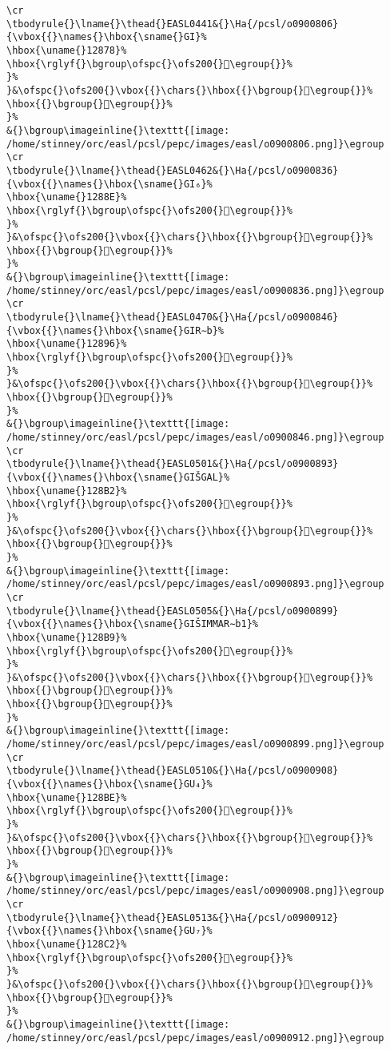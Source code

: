\begin{verbatim}
\cr
\tbodyrule{}\lname{}\thead{}EASL0441&{}\Ha{/pcsl/o0900806}{\vbox{{}\names{}\hbox{\sname{}GI}%
\hbox{\uname{}12878}%
\hbox{\rglyf{}\bgroup\ofspc{}\ofs200{}𒡸\egroup{}}%
}%
}&\ofspc{}\ofs200{}\vbox{{}\chars{}\hbox{{}\bgroup{}𒢄\egroup{}}%
\hbox{{}\bgroup{}𒡸\egroup{}}%
}%
&{}\bgroup\imageinline{}\texttt{[image: /home/stinney/orc/easl/pcsl/pepc/images/easl/o0900806.png]}\egroup
\cr
\tbodyrule{}\lname{}\thead{}EASL0462&{}\Ha{/pcsl/o0900836}{\vbox{{}\names{}\hbox{\sname{}GI₆}%
\hbox{\uname{}1288E}%
\hbox{\rglyf{}\bgroup\ofspc{}\ofs200{}𒢎\egroup{}}%
}%
}&\ofspc{}\ofs200{}\vbox{{}\chars{}\hbox{{}\bgroup{}𒢏\egroup{}}%
\hbox{{}\bgroup{}𒢎\egroup{}}%
}%
&{}\bgroup\imageinline{}\texttt{[image: /home/stinney/orc/easl/pcsl/pepc/images/easl/o0900836.png]}\egroup
\cr
\tbodyrule{}\lname{}\thead{}EASL0470&{}\Ha{/pcsl/o0900846}{\vbox{{}\names{}\hbox{\sname{}GIR∼b}%
\hbox{\uname{}12896}%
\hbox{\rglyf{}\bgroup\ofspc{}\ofs200{}𒢖\egroup{}}%
}%
}&\ofspc{}\ofs200{}\vbox{{}\chars{}\hbox{{}\bgroup{}𒢕\egroup{}}%
\hbox{{}\bgroup{}𒢖\egroup{}}%
}%
&{}\bgroup\imageinline{}\texttt{[image: /home/stinney/orc/easl/pcsl/pepc/images/easl/o0900846.png]}\egroup
\cr
\tbodyrule{}\lname{}\thead{}EASL0501&{}\Ha{/pcsl/o0900893}{\vbox{{}\names{}\hbox{\sname{}GIŠGAL}%
\hbox{\uname{}128B2}%
\hbox{\rglyf{}\bgroup\ofspc{}\ofs200{}𒢲\egroup{}}%
}%
}&\ofspc{}\ofs200{}\vbox{{}\chars{}\hbox{{}\bgroup{}𒢳\egroup{}}%
\hbox{{}\bgroup{}𒢲\egroup{}}%
}%
&{}\bgroup\imageinline{}\texttt{[image: /home/stinney/orc/easl/pcsl/pepc/images/easl/o0900893.png]}\egroup
\cr
\tbodyrule{}\lname{}\thead{}EASL0505&{}\Ha{/pcsl/o0900899}{\vbox{{}\names{}\hbox{\sname{}GIŠIMMAR∼b1}%
\hbox{\uname{}128B9}%
\hbox{\rglyf{}\bgroup\ofspc{}\ofs200{}𒢹\egroup{}}%
}%
}&\ofspc{}\ofs200{}\vbox{{}\chars{}\hbox{{}\bgroup{}𒢷\egroup{}}%
\hbox{{}\bgroup{}𒢸\egroup{}}%
\hbox{{}\bgroup{}𒢹\egroup{}}%
}%
&{}\bgroup\imageinline{}\texttt{[image: /home/stinney/orc/easl/pcsl/pepc/images/easl/o0900899.png]}\egroup
\cr
\tbodyrule{}\lname{}\thead{}EASL0510&{}\Ha{/pcsl/o0900908}{\vbox{{}\names{}\hbox{\sname{}GU₄}%
\hbox{\uname{}128BE}%
\hbox{\rglyf{}\bgroup\ofspc{}\ofs200{}𒢾\egroup{}}%
}%
}&\ofspc{}\ofs200{}\vbox{{}\chars{}\hbox{{}\bgroup{}𒣁\egroup{}}%
\hbox{{}\bgroup{}𒢾\egroup{}}%
}%
&{}\bgroup\imageinline{}\texttt{[image: /home/stinney/orc/easl/pcsl/pepc/images/easl/o0900908.png]}\egroup
\cr
\tbodyrule{}\lname{}\thead{}EASL0513&{}\Ha{/pcsl/o0900912}{\vbox{{}\names{}\hbox{\sname{}GU₇}%
\hbox{\uname{}128C2}%
\hbox{\rglyf{}\bgroup\ofspc{}\ofs200{}𒣂\egroup{}}%
}%
}&\ofspc{}\ofs200{}\vbox{{}\chars{}\hbox{{}\bgroup{}𒣂\egroup{}}%
\hbox{{}\bgroup{}𒣃\egroup{}}%
}%
&{}\bgroup\imageinline{}\texttt{[image: /home/stinney/orc/easl/pcsl/pepc/images/easl/o0900912.png]}\egroup

\end{verbatim}
